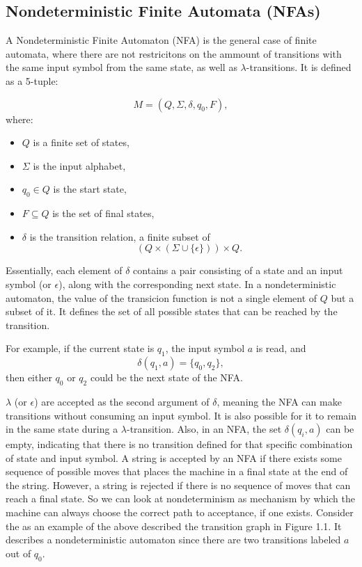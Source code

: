 \subsection{Nondeterministic Finite Automata (NFAs)}

A Nondeterministic Finite Automaton (NFA) is the general case of finite automata, where there are not restricitons on the ammount of transitions with
the same input symbol from the same state, as well as \(\lambda\)-transitions. It is defined as a 5-tuple:

\[
M = (Q, \Sigma, \delta, q_0, F),
\]
where:
\begin{itemize}
    \item \(Q\) is a finite set of states,
    \item \(\Sigma\) is the input alphabet,
    \item \(q_0 \in Q\) is the start state,
    \item \(F \subseteq Q\) is the set of final states,
    \item \(\delta\) is the transition relation, a finite subset of
    \[
    (Q \times (\Sigma \cup \{\epsilon\})) \times Q.
    \]
\end{itemize}
Essentially, each element of \(\delta\) contains a pair consisting of a state and an input symbol (or \(\epsilon\)), along with the corresponding next state.
In a nondeterministic automaton, the value of the transicion function is not a single element of \(Q\) but a subset of it. 
It  defines the set of all possible states that can be reached by the transition. 

For example, if the current state is \(q_1\), the input symbol \(a\) is read, and
\[
\delta(q_1, a) = \{q_0, q_2\},
\]
then either \(q_0\) or \(q_2\) could be the next state of the NFA. 

\(\lambda\) (or \(\epsilon\)) are accepted as the second argument of \(\delta\), 
meaning the NFA can make transitions without consuming an input symbol. 
It is also possible for it to remain in the same state during a \(\lambda\)-transition.
Also, in an NFA, the set \(\delta(q_i, a)\) can be empty, indicating that there is no transition defined for that specific combination of state and input symbol.
A string is accepted by an NFA if there exists some sequence of possible moves that places the machine in a final state at the end of the string. 
However, a string is rejected if there is no sequence of moves that can reach a final state. So we can look at nondeterminism as mechanism 
by which the machine can always choose the correct path to acceptance, if one exists.
Consider the as an example of the above described the transition graph in Figure 1.1. It describes a nondeterministic automaton since there are
two transitions labeled \(a\) out of \(q_0\).

